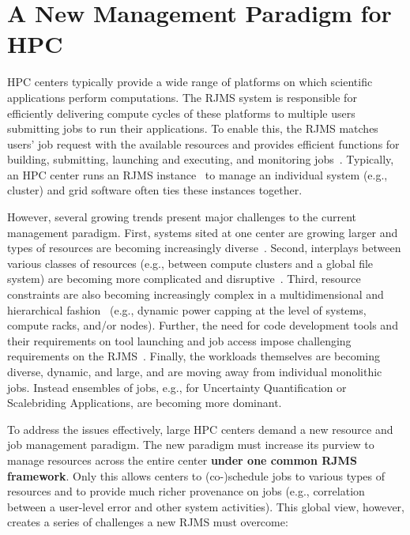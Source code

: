 \section{A New Management Paradigm for HPC}
\label{label:paradigm}
HPC centers typically provide a wide range of 
platforms on which scientific applications perform
computations.
The RJMS system is responsible for efficiently delivering 
compute cycles of these platforms
to multiple users submitting jobs to run their applications. 
To enable this, the RJMS matches users' job request with the available 
resources and provides efficient functions 
for building, submitting, launching and executing, 
and monitoring jobs~\cite{GeorgiouThesis}. 
Typically, an HPC center runs an RJMS instance~\cite{Jette02slurm} 
to manage an individual system (e.g., cluster) and 
grid software often ties these instances together. 

However, several growing trends present major challenges 
to the current management paradigm. 
First, systems sited at one center are growing larger 
and types of resources are becoming increasingly diverse~\cite{GeorgiouThesis}. 
Second, interplays between 
various classes of resources
(e.g., between compute clusters and a global file system)
are becoming more complicated and disruptive~\cite{SCR,SPINDLE}. 
Third, resource constraints are also becoming increasingly
complex in a multidimensional and hierarchical fashion~\cite{power-overprovision}
(e.g., dynamic power capping at the level of systems, compute racks, and/or nodes).
Further, the need for code development tools and their requirements on tool launching and job access
impose challenging requirements on the RJMS~\cite{STAT,SPINDLE,PRUNER,SCR,launchmon}.
Finally, the workloads themselves are becoming 
diverse, dynamic, and large, and are moving away from individual monolithic jobs. Instead
ensembles of jobs, e.g., for Uncertainty Quantification or Scalebriding  Applications, are
becoming more dominant.

To address the issues effectively,
large HPC centers demand a new resource and job management paradigm.
The new paradigm must increase its purview
to manage resources across the entire center
{\bf under one common RJMS framework}. Only this allows
centers to (co-)schedule jobs 
to various types of resources and to
provide much richer provenance on jobs (e.g., correlation between
a user-level error and other system activities). This global view, however,
creates a series of challenges a new RJMS must overcome:

